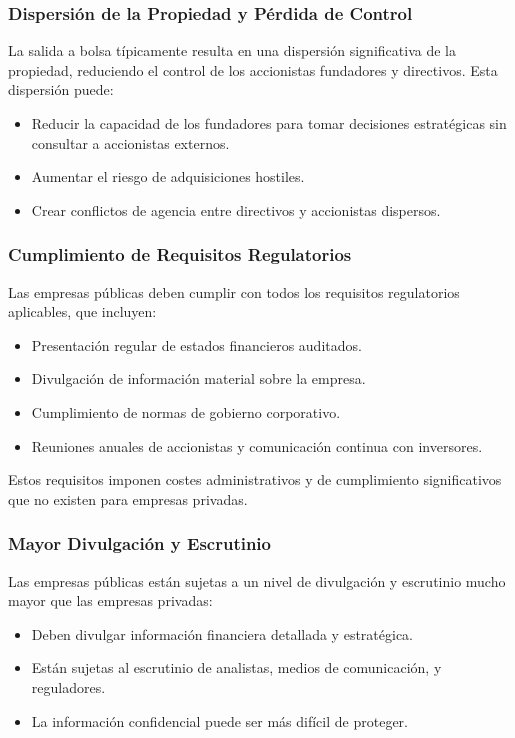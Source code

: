 \subsubsection{Dispersión de la Propiedad y Pérdida de Control}

La salida a bolsa típicamente resulta en una dispersión significativa de la propiedad, reduciendo el control de los accionistas fundadores y directivos. Esta dispersión puede:

\begin{itemize}
\item Reducir la capacidad de los fundadores para tomar decisiones estratégicas sin consultar a accionistas externos.
\item Aumentar el riesgo de adquisiciones hostiles.
\item Crear conflictos de agencia entre directivos y accionistas dispersos.
\end{itemize}

\subsubsection{Cumplimiento de Requisitos Regulatorios}

Las empresas públicas deben cumplir con todos los requisitos regulatorios aplicables, que incluyen:

\begin{itemize}
\item Presentación regular de estados financieros auditados.
\item Divulgación de información material sobre la empresa.
\item Cumplimiento de normas de gobierno corporativo.
\item Reuniones anuales de accionistas y comunicación continua con inversores.
\end{itemize}

Estos requisitos imponen costes administrativos y de cumplimiento significativos que no existen para empresas privadas.

\subsubsection{Mayor Divulgación y Escrutinio}

Las empresas públicas están sujetas a un nivel de divulgación y escrutinio mucho mayor que las empresas privadas:

\begin{itemize}
\item Deben divulgar información financiera detallada y estratégica.
\item Están sujetas al escrutinio de analistas, medios de comunicación, y reguladores.
\item La información confidencial puede ser más difícil de proteger.
\end{itemize}

